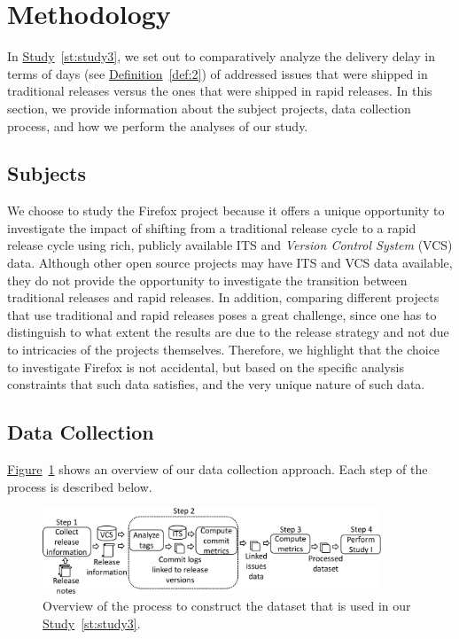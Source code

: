 \section{Methodology} \label{sec:studysettings}

In \hyperref[st:study3]{Study}~\ref{st:study3}, we set out to comparatively
analyze the delivery delay in terms of days (see
\hyperref[def:2]{Definition}~\ref{def:2}) of addressed issues that were shipped
in traditional releases versus the ones that were shipped in rapid releases. In
this section, we provide information about the subject projects, data collection
process, and how we perform the analyses of our study.

\subsection{Subjects}

We choose to study the Firefox project because it offers a unique opportunity to
investigate the impact of shifting from a traditional release cycle to a rapid
release cycle using rich, publicly available ITS and \textit{Version Control
System} (VCS) data. Although other open source projects may have ITS and VCS
data available, they do not provide the opportunity to investigate the
transition between traditional releases and rapid releases. In addition,
comparing different projects that use traditional and rapid releases poses a
great challenge, since one has to distinguish to what extent the results are due
to the release strategy and not due to intricacies of the projects themselves.
Therefore, we highlight that the choice to investigate Firefox is not
accidental, but based on the specific analysis constraints that such data
satisfies, and the very unique nature of such data.

\subsection{Data Collection}\label{ch5:datacollection}

\hyperref[fig:database_construction]{Figure}~\ref{fig:database_construction}
shows an overview of our data collection approach. Each step of the process is
described below.

\begin{figure}[!]
	\centering
	\includegraphics[width=0.90\textwidth,keepaspectratio]
	{chapters/chapter5/figures/database_construction_final.pdf}
	\caption{
		Overview of the process to construct the dataset that is used in
		our \hyperref[st:study3]{Study}~\ref{st:study3}.
	}
	\label{fig:database_construction}
\end{figure}

